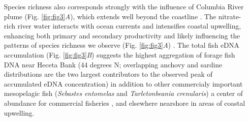 \documentclass{article}
\begin{document}
Species richness also corresponds strongly with the influence of Columbia River plume (Fig. \ref{fig:fig3}\textit{A}), which extends well beyond the coastline \cite{hickey2003}. The nitrate-rich river water interacts with ocean currents and intensifies coastal upwelling, enhancing both primary and secondary productivity \cite{hickey2010} and likely influencing the patterns of species richness we observe (Fig. \ref{fig:fig3}\textit{A}) \cite{tolimieri2015}. The total fish eDNA accumulation (Fig. \ref{fig:fig3}\textit{B}) suggests the highest aggregation of forage fish DNA near Heceta Bank (44 degrees N; overlapping anchovy and sardine distributions are the two largest contributors to the observed peak of accumulated eDNA concentration) in addition to other commercialy important mesopelagic fish (\textit{Sebastes entomelas} and \textit{Tarletonbeania crenularis}) a center of abundance for commercial fisheries \cite{bosley2014,Tissot2008TwentyYO}, and elsewhere nearshore in areas of coastal upwelling.
\end{document}
